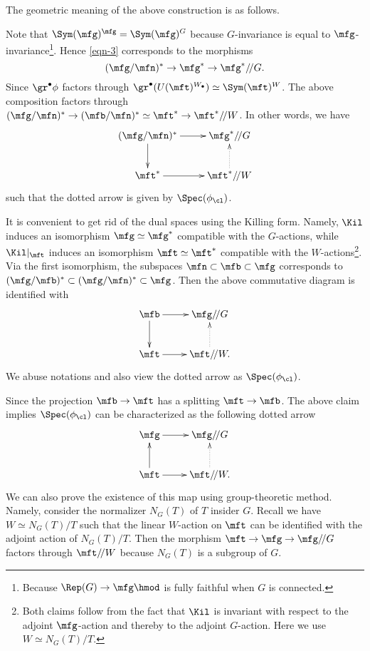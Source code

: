 	\begin{rem}
		\label{rem-geometric-Chevalley}
		The geometric meaning of the above construction is as follows. 

		Note that $\Sym(\mfg)^\mfg = \Sym(\mfg)^G$ because $G$-invariance is equal to $\mfg$-invariance\footnote{Because $\Rep(G) \to \mfg\hmod$ is fully faithful when $G$ is connected.}. Hence \eqref{eqn-3} corresponds to the morphisms
		\[
			(\mfg/\mfn)^* \to \mfg^* \to \mfg^*/\!/G.
		\]
		Since $\gr^\bullet \phi$ factors through $\gr^\bullet(U(\mft)^{W_\bullet}) \simeq \Sym(\mft)^W$. The above composition factors through $(\mfg/\mfn)^* \to (\mfb/\mfn)^* \simeq \mft^* \to \mft^*/\!/W$. In other words, we have
		\[
			\xymatrix{
				(\mfg/\mfn)^* \ar[r] \ar[d] & \mfg^*/\!/G  \\
				\mft^* \ar[r] & \mft^*/\!/W \ar@{.>}[u]
			}
		\]
		such that the dotted arrow is given by $\Spec(\phi_\cl)$.

		It is convenient to get rid of the dual spaces using the Killing form. Namely, $\Kil$ induces an isomorphism $\mfg\simeq \mfg^*$ compatible with the $G$-actions, while $\Kil|_\mft$ induces an isomorphism $\mft\simeq \mft^*$ compatible with the $W$-actions\footnote{Both claims follow from the fact that $\Kil$ is invariant with respect to the adjoint $\mfg$-action and thereby to the adjoint $G$-action. Here we use $W\simeq N_G(T)/T$.}. Via the first isomorphism, the subspaces $\mfn\subset \mfb\subset \mfg$ corresponds to $(\mfg/\mfb)^*\subset (\mfg/\mfn)^* \subset \mfg$. Then the above commutative diagram is identified with
		\begin{equation}
			\label{eqn-square}
			\xymatrix{
				\mfb \ar[r] \ar[d] & \mfg/\!/G  \\
				\mft \ar[r] & \mft/\!/W. \ar@{.>}[u]
			}
		\end{equation}
		We abuse notations and also view the dotted arrow as $\Spec(\phi_\cl)$.

	\end{rem}

	\begin{rem}
		Since the projection $\mfb\to \mft$ has a splitting $\mft \to \mfb$. The above claim implies $\Spec(\phi_\cl)$ can be characterized as the following dotted arrow
		\[
			\xymatrix{
				\mfg \ar[r]  & \mfg/\!/G  \\
				\mft \ar[r] \ar[u] & \mft/\!/W. \ar@{.>}[u]
			}
		\]
 		We can also prove the existence of this map using group-theoretic method. Namely, consider the normalizer $N_G(T)$ of $T$ insider $G$. Recall we have $W\simeq N_G(T)/T$ such that the linear $W$-action on $\mft$ can be identified with the adjoint action of $N_G(T)/T$. Then the morphism $\mft \to \mfg\to  \mfg/\!/G$ factors through $\mft/\!/ W$ because $N_G(T)$ is a subgroup of $G$.
	\end{rem}

